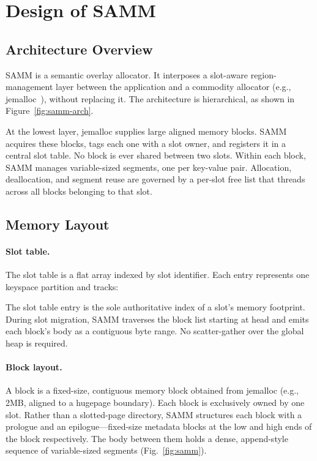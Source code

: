 \section{Design of SAMM}
\label{sec:design}
\label{sec:data_organization}
\label{sec:samm}

\subsection{Architecture Overview}
\label{sec:samm-arch}

SAMM is a semantic overlay allocator. It interposes a slot-aware region-management layer between the application and a commodity allocator (e.g., jemalloc~\cite{jemalloc}), without replacing it. The architecture is hierarchical, as shown in Figure~\ref{fig:samm-arch}.


At the lowest layer, jemalloc supplies large aligned memory blocks. SAMM acquires these blocks, tags each one with a slot owner, and registers it in a central slot table. No block is ever shared between two slots. Within each block, SAMM manages variable-sized segments, one per key-value pair. Allocation, deallocation, and segment reuse are governed by a per-slot free list that threads across all blocks belonging to that slot.

\subsection{Memory Layout}
\label{sec:samm-layout}
\label{sec:samm-blocks}
\label{sec:samm-block-layout}
\label{sec:samm-segments}


\paragraph{Slot table.}
The slot table is a flat array indexed by slot identifier. Each entry represents one keyspace partition and tracks:

The slot table entry is the sole authoritative index of a slot's memory footprint. During slot migration, SAMM traverses the block list starting at head and emits each block's body as a contiguous byte range. No scatter-gather over the global heap is required.

\paragraph{Block layout.}
A block is a fixed-size, contiguous memory block obtained from jemalloc (e.g., 2MB, aligned to a hugepage boundary). Each block is exclusively owned by one slot. Rather than a slotted-page directory, SAMM structures each block with a prologue and an epilogue---fixed-size metadata blocks at the low and high ends of the block respectively. The body between them holds a dense, append-style sequence of variable-sized segments (Fig.~\ref{fig:samm}).


